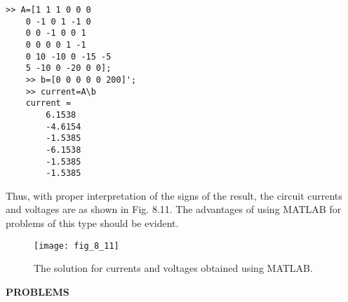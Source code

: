 \documentclass[../main.tex]{subfiles}
\begin{document}
\begin{lstlisting}[numbers=none,frame=none]
    >> A=[1 1 1 0 0 0
    0 -1 0 1 -1 0
    0 0 -1 0 0 1
    0 0 0 0 1 -1
    0 10 -10 0 -15 -5
    5 -10 0 -20 0 0];
    >> b=[0 0 0 0 0 200]';
    >> current=A\b
    current =
        6.1538
        -4.6154
        -1.5385
        -6.1538
        -1.5385
        -1.5385
\end{lstlisting}

Thus, with proper interpretation of the signs of the result, the circuit currents and voltages are as shown in Fig. 8.11. The advantages of using MATLAB for problems of this type should be evident.

\begin{figure}[H]
    \centering
    \texttt{[image: fig\_8\_11]}
    \caption{\textsf{The solution for currents and voltages obtained using MATLAB.}}
    \label{fig:fig_8_11}
\end{figure}
\newpage

\noindent\textbf{PROBLEMS}
\end{document}
